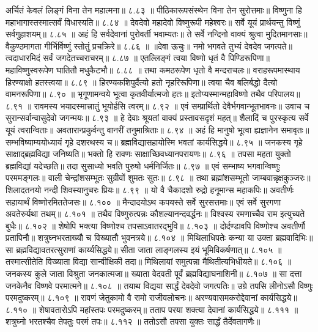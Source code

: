 अर्चितं केवलं लिङ्गं विना तेन महात्मना॥ ८.८३ ॥
पीठिकारूपसंस्थेन विना तेन सुरोत्तमाः॥
विष्णुना हि महाभागास्तस्मात्सर्वं विधास्यति॥ ८.८४ ॥
देवदेवो महादेवो विष्णुरूपी महेश्वरः॥
सर्वे यूयं प्रार्थयन्तु विष्णुं सर्वगुहाशयम्॥ ८.८५ ॥
अहं हि सर्वदेवानां पुरोवर्ती भवाम्यतः॥
ते सर्वे नन्दिनो वाक्यं श्रुत्वा मुदितमानसाः॥
वैकुण्ठमागता गीर्भिर्विष्णुं स्तोतुं प्रचक्रिरे॥ ८.८६ ॥
॥देवा ऊचुः॥
नमो भगवते तुभ्यं देवदेव जगत्पते॥
त्वदाधारमिदं सर्वं जगदेतच्चराचरम्॥ ८.८७ ॥
एतल्लिङ्गं त्वया विष्णो धृतं वै पिण्डिरूपिणा॥
महाविष्णुस्वरूपेण घातितौ मधुकैटभौ॥ ८.८८ ॥
तथा कमठरूपेण धृतो वै मन्दराचलः॥
वराहरूपमास्थाय हिरण्याक्षो हतस्त्वया॥ ८.८९ ॥
हिरण्यकशिपुर्दैत्यो हतो नृहरिरूपिणा॥
त्वया चैव बलिर्बद्धो दैत्यो वामनरूपिणा॥ ८.९० ॥
भृगूणामन्वये भूत्वा कृतवीर्यात्मजो हतः॥
इतोप्यस्मान्महाविष्णो तथैव परिपालय॥ ८.९१ ॥
रावमस्य भयादस्मात्त्रातुं भूयोर्हसि त्वरम्॥ ८.९२ ॥
एवं सम्प्रार्थितो देवैर्भगवान्भूतभावनः॥
उवाच च सुरान्सर्वान्वासुदेवो जगन्मयः॥ ८.९३ ॥
हे देवाः श्रूयतां वाक्यं प्रस्तावसदृशं महत्॥
शैलादिं च पुरस्कृत्य सर्वे यूयं त्वरान्विताः॥
अवतारान्प्रकुर्वन्तु वानरीं तनुमाश्रिताः॥ ८.९४ ॥
अहं हि मानुषो भूत्वा ह्यज्ञानेन समावृतः॥
सम्भविष्याम्ययोध्यायं गृहे दशरथस्य च॥
ब्रह्मविद्यासहायोस्मि भवतां कार्यसिद्धये॥ ८.९५ ॥
जनकस्य गृहे साक्षाद्ब्रह्मविद्या जनिष्यति॥
भक्तो हि रावणः साक्षाच्छिवध्यानपरायणः॥ ८.९६ ॥
तपसा महता युक्तो ब्रह्मविद्यां यदेच्छति॥
तदा सुसाध्यो भवति पुरुषो धर्मनिर्जितः॥ ८.९७ ॥
एवं सम्भाष्य भगवान्विष्णुः परममङ्गलः॥
वाली चेन्द्रांशसम्भूतः सुग्रीवों शुमतः सुतः॥ ८.९८ ॥
तथा ब्रह्मांशसम्भूतो जाम्बवान्नृक्षकुञ्जरः॥
शिलादतनयो नन्दी शिवस्यानुचरः प्रियः॥ ८.९९ ॥
यो वै चैकादशो रुद्रो हनूमान्स महाकपिः॥
अवतीर्णः सहायार्थं विष्णोरमिततेजसः॥ ८.१०० ॥
मैन्दादयोऽथ कपयस्ते सर्वे सुरसत्तमाः॥
एवं सर्वे सुरगणा अवतेरुर्यथा तथम्॥ ८.१०१ ॥
तथैव विष्णुरुत्पन्नः कौशल्यानन्दवर्द्धनः॥
विश्वस्य रमणाच्चैव राम इत्युच्यते बुधैः॥ ८.१०२ ॥
शेषोपि भक्त्या विष्णोश्च तपसाऽवातरद्भुवि॥ ८.१०३ ॥
दोर्दण्डावपि विष्णोश्च अवतीर्णौ प्रतापिनौ॥
शत्रुघ्नभरताख्यौ च विख्यातौ भुवनत्रये॥ ८.१०४ ॥
मिथिलाधिपतेः कन्या या उक्ता ब्रह्मवादिभिः॥
सा ब्रह्मविद्यावतरत्सुराणां कार्य्यसिद्धये॥
सीता जाता लाङ्गलस्य इयं भूमिविकर्षणात्॥ ८.१०५ ॥
तस्मात्सीतेति विख्याता विद्या सान्वीक्षिकी तदा॥
मिथिलायां समुत्पन्ना मैथितीत्यभिधीयते॥ ८.१०६ ॥
जनकस्य कुले जाता विश्रुता जनकात्मजा॥
ख्याता वेदवती पूर्वं ब्रह्मविद्याघनाशिनी॥ ८.१०७ ॥
सा दत्ता जनकेनैव विष्णवे परमात्मने॥ ८.१०८ ॥
तयाथ विद्यया सार्द्धं देवदेवो जगत्पतिः॥
उग्रे तपसि लीनोऽसौ विष्णुः परमदुष्करम्॥ ८.१०९ ॥
रावणं जेतुकामो वै रामो राजीवलोचनः॥
अरण्यवासमकरोद्देवानां कार्यसिद्धये॥ ८.११० ॥
शेषावतारोऽपि महांस्तपः परमदुष्करम्॥
तताप परया शक्त्या देवानां कार्यसिद्धये॥ ८.१११ ॥
शत्रुघ्नो भरतश्चैव तेपतुः परमं तपः॥ ८.११२ ॥
ततोऽसौ तपसा युक्तः सार्द्धं तैर्देवतागणैः॥

